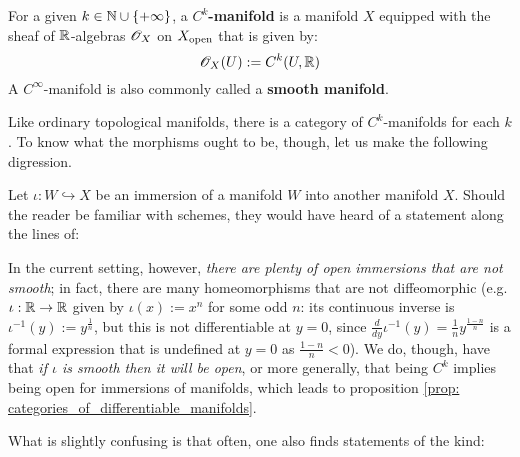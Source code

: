         \begin{definition} \label{def: differentiable_manifolds}
            For a given $k \in \mathbb{N} \cup \{+\infty\}$, a \textbf{$C^k$-manifold} is a manifold $X$ equipped with the sheaf of $\mathbb{R}$-algebras $\mathscr{O}_X$ on $X_{\mathrm{open}}$ that is given by:
                $$\mathscr{O}_X(U) := C^k(U, \mathbb{R})$$
            A $C^{\infty}$-manifold is also commonly called a \textbf{smooth manifold}.
        \end{definition}

        Like ordinary topological manifolds, there is a category of $C^k$-manifolds for each $k$. To know what the morphisms ought to be, though, let us make the following digression.
        \begin{remark} \label{remark: open_does_not_imply_smooth}
            Let $\iota: W \hookrightarrow X$ be an immersion of a manifold $W$ into another manifold $X$. Should the reader be familiar with schemes, they would have heard of a statement along the lines of:
            
            \begin{center}
            \end{center}
            \noindent
            In the current setting, however, \textit{there are plenty of open immersions that are not smooth}; in fact, there are many homeomorphisms that are not diffeomorphic (e.g. $\iota: \mathbb{R} \to \mathbb{R}$ given by $\iota(x) := x^n$ for some odd $n$: its continuous inverse is $\iota^{-1}(y) := y^{\frac1n}$, but this is not differentiable at $y = 0$, since $\frac{d}{dy} \iota^{-1}(y) = \frac1n y^{\frac{1 - n}{n}}$ is a formal expression that is undefined at $y = 0$ as $\frac{1 - n}{n} < 0$). We do, though, have that \textit{if $\iota$ is smooth then it will be open}, or more generally, that being $C^k$ implies being open for immersions of manifolds, which leads to proposition \ref{prop: categories_of_differentiable_manifolds}.

            What is slightly confusing is that often, one also finds statements of the kind:
            

\end{remark}
